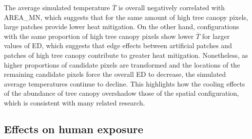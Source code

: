 \documentclass[10pt,letterpaper]{article}
\begin{document}
The average simulated temperature $\overline{T}$ is overall negatively correlated with AREA\_MN, which suggests that for the same amount of high tree canopy pixels, large patches provide lower heat mitigation.
On the other hand, configurations with the same proportion of high tree canopy pixels show lower $\overline{T}$ for larger values of ED, which suggests that edge effects between artificial patches and patches of high tree canopy contribute to greater heat mitigation.
Nonetheless, as higher proportions of candidate pixels are transformed and the locations of the remaining candidate pixels force the overall ED to decrease, the simulated average temperatures continue to decline.
This highlights how the cooling effects of the abundance of tree canopy overshadow those of the spatial configuration, which is consistent with many related research.



\subsection*{Effects on human exposure}
\end{document}
